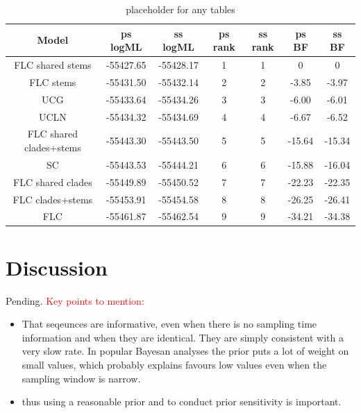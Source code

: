 \documentclass[11pt]{article}
\begin{document}
\begin{table}[H]
	\begin{center}
		\caption{placeholder for any tables}
		\label{table:table2}
		\begin{tabular}{c|c|c|c|c|c|c}
			\textbf{Model} & \textbf{ps logML} & \textbf{ss logML} & \textbf{ps rank} & \textbf{ss rank} & \textbf{ps BF} & \textbf{ss BF} \\ 
			\hline
		FLC shared stems & -55427.65 & -55428.17 & 1 & 1 & 0 & 0 \\ 
		FLC stems & -55431.50 & -55432.14 & 2 & 2 & -3.85 & -3.97 \\
		UCG	&	-55433.64 & -55434.26 & 3 & 3 & -6.00 & -6.01 \\
		UCLN & -55434.32 & -55434.69 & 4 & 4 & -6.67 & -6.52 \\ 
		FLC shared clades+stems & -55443.30 & -55443.50 & 5 & 5 & -15.64 & -15.34 \\ 
		SC & -55443.53 & -55444.21 & 6 & 6 & -15.88 & -16.04\\ 
		FLC shared clades & -55449.89 & -55450.52 & 7 & 7 & -22.23 & -22.35 \\ 
		FLC clades+stems & -55453.91 & -55454.58 & 8 & 8 & -26.25 & -26.41 \\ 
		FLC & -55461.87 & -55462.54 & 9 & 9 & -34.21 & -34.38 \\ 
		\end{tabular}
	\end{center}
\end{table}





\section{Discussion}
Pending.
\textcolor{red}{Key points to mention:}

\begin{itemize}
	\item That seqeunces are informative, even when there is no sampling time information and when they are identical. They are simply consistent with a very slow rate. In popular Bayesan analyses the prior puts a lot of weight on small values, which probably explains favours low values even when the sampling window is narrow.
	\item thus using a reasonable prior and to conduct prior sensitivity is important. 
\end{itemize}
\end{document}
